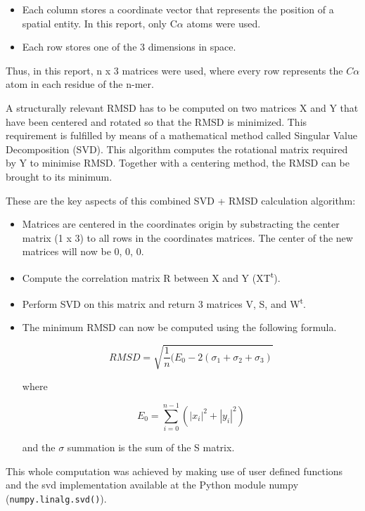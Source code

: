 \documentclass[a4paper, 11pt]{article} %
\begin{document}
\begin{itemize}

\item Each column stores a coordinate vector that represents the position of a spatial entity. In this report, only C$\alpha$ atoms were used.

\item Each row stores one of the 3 dimensions in space.
\end{itemize}

Thus, in this report, n x 3 matrices were used, where every row represents the $C\alpha$ atom in each residue of the n-mer.

A structurally relevant RMSD has to be computed on two matrices X and Y that have been centered and rotated so that the RMSD is minimized. This requirement is fulfilled by means of a mathematical method called Singular Value Decomposition (SVD). This algorithm computes the rotational matrix required by Y to minimise RMSD. Together with a centering method, the RMSD can be brought to its minimum.

These are the key aspects of this combined SVD + RMSD calculation algorithm:

\begin{itemize}

\item Matrices are centered in the coordinates origin by substracting the center matrix (1 x 3) to all rows in the coordinates matrices. The center of the new matrices will now be 0, 0, 0.

\item Compute the correlation matrix R between X and Y (XT\textsuperscript{t}).

\item Perform SVD on this matrix and return 3 matrices V, S, and W\textsuperscript{t}.

\item The minimum RMSD can now be computed using the following formula.

$$RMSD = \sqrt { \frac { 1 }{ n }  ( E_0 - 2(\sigma_1 + \sigma_2 + \sigma_3 )}$$

where

$$E_0 = \sum _{ i=0 }^{ n-1 }(|x_i|^{2} + |y_i|^{2})$$

and the $\sigma$ summation is the sum of the S matrix.

\end{itemize}

This whole computation was achieved by making use of user defined functions and the svd implementation available at the Python module numpy \cite{numpy} (\texttt{numpy.linalg.svd()}).
\end{document}
